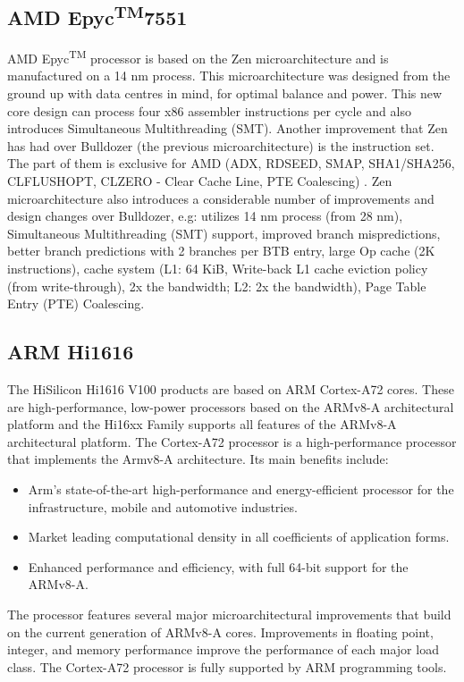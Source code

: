 \subsection{AMD Epyc\texorpdfstring{\textsuperscript{TM}}\ 7551}
AMD Epyc\textsuperscript{TM} processor is based on the Zen microarchitecture and is manufactured on a 14 nm process. This microarchitecture was designed from the ground up with data centres in mind, for optimal balance and power. This new core design can process four x86 assembler instructions per cycle and also introduces Simultaneous Multithreading (SMT). Another improvement that Zen has had over Bulldozer (the previous microarchitecture) is the instruction set. The part of them is exclusive for AMD (ADX, RDSEED, SMAP, SHA1/SHA256, CLFLUSHOPT, CLZERO - Clear Cache Line, PTE Coalescing) \cite{2019:epyc} \cite{now:epyc}.
Zen microarchitecture also introduces a considerable number of improvements and design changes over Bulldozer, e.g: utilizes 14 nm process (from 28 nm), Simultaneous Multithreading (SMT) support, improved branch mispredictions, better branch predictions with 2 branches per BTB entry, large Op cache (2K instructions), cache system (L1: 64 KiB, Write-back L1 cache eviction policy (from write-through), 2x the bandwidth; L2: 2x the bandwidth), Page Table Entry (PTE) Coalescing.

\subsection{ARM Hi1616}
The HiSilicon Hi1616 V100 products are based on ARM Cortex-A72 cores. These are high-performance, low-power processors based on the ARMv8-A architectural platform and the Hi16xx Family supports all features of the ARMv8-A architectural platform.
The Cortex-A72 processor is a high-performance processor that implements the Armv8-A architecture. Its main benefits include:
\begin{itemize}
  \item[\textbullet]Arm's state-of-the-art high-performance and energy-efficient processor for the infrastructure, mobile and automotive industries.
  \item[\textbullet]Market leading computational density in all coefficients of application forms.
  \item[\textbullet]Enhanced performance and efficiency, with full 64-bit support for the ARMv8-A.
\end{itemize}
The processor features several major microarchitectural improvements that build on the current generation of ARMv8-A cores. Improvements in floating point, integer, and memory performance improve the performance of each major load class. \cite{2017:hi1616} \cite{2019:hi1616}
The Cortex-A72 processor is fully supported by ARM programming tools.

